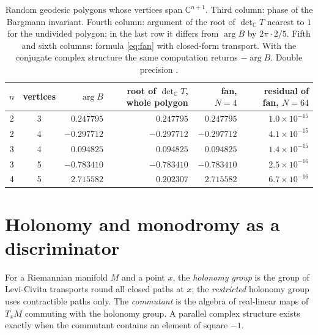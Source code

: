 \begin{table}[ht]\centering\small
\begin{tabular}{@{}ccrrrr@{}}\toprule
$n$ & vertices & $\arg B$ & root of $\det_{\mathbb{C}}T$, whole polygon & fan, $N=4$ & residual of fan, $N=64$\\\midrule
2 & 3 & $0.247795$ & $0.247795$ & $0.247795$ & $1.0\times10^{-15}$\\
2 & 4 & $-0.297712$ & $-0.297712$ & $-0.297712$ & $4.1\times10^{-15}$\\
3 & 4 & $0.094825$ & $0.094825$ & $0.094825$ & $1.4\times10^{-15}$\\
3 & 5 & $-0.783410$ & $-0.783410$ & $-0.783410$ & $2.5\times10^{-16}$\\
4 & 5 & $2.715582$ & $0.202307$ & $2.715582$ & $6.7\times10^{-16}$\\\bottomrule
\end{tabular}
\caption{Random geodesic polygons whose vertices span $\mathbb{C}^{n+1}$. Third column: phase of the Bargmann invariant. Fourth column: argument of the root of $\det_{\mathbb{C}}T$ nearest to $1$ for the undivided polygon; in the last row it differs from $\arg B$ by $2\pi\cdot2/5$. Fifth and sixth columns: formula \eqref{eq:fan} with closed-form transport. With the conjugate complex structure the same computation returns $-\arg B$. Double precision \cite{comp2}.}\label{tab:fan}
\end{table}

\section{Holonomy and monodromy as a discriminator}\label{sec:disc}

For a Riemannian manifold $M$ and a point $x$, the \emph{holonomy group} is the group of Levi-Civita transports round all closed paths at $x$; the \emph{restricted} holonomy group uses contractible paths only. The \emph{commutant} is the algebra of real-linear maps of $T_xM$ commuting with the holonomy group. A parallel complex structure exists exactly when the commutant contains an element of square $-1$.

